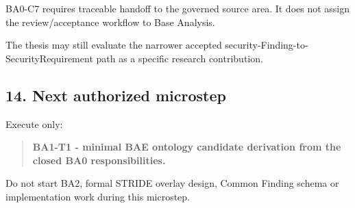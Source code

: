 \documentclass[
  10pt,
]{article}
\begin{document}
BA0-C7 requires traceable handoff to the governed source area. It does
not assign the review/acceptance workflow to Base Analysis.

The thesis may still evaluate the narrower accepted
security-Finding-to-SecurityRequirement path as a specific research
contribution.

\subsection{14. Next authorized
microstep}\label{next-authorized-microstep}

Execute only:

\begin{quote}
\textbf{BA1-T1 - minimal BAE ontology candidate derivation from the
closed BA0 responsibilities.}
\end{quote}

Do not start BA2, formal STRIDE overlay design, Common Finding schema or
implementation work during this microstep.
\end{document}
